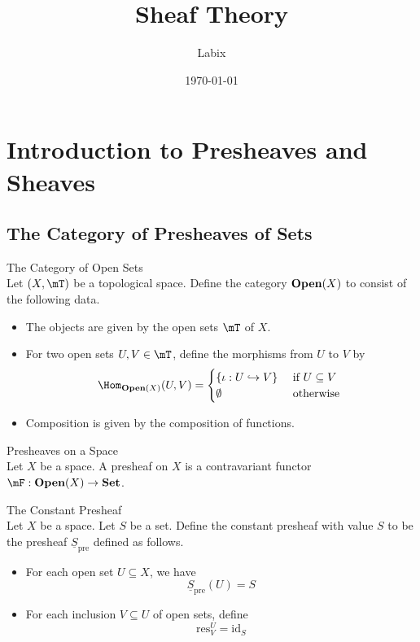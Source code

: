 \documentclass[a4paper]{article}
\title{Sheaf Theory}
\author{Labix}
\date{\today}
\begin{document}
\maketitle
\begin{abstract}
\end{abstract}
\pagebreak
\tableofcontents
\pagebreak

\pagebreak
\section{Introduction to Presheaves and Sheaves}
\subsection{The Category of Presheaves of Sets}
\begin{defn}{The Category of Open Sets}{}\\
Let $(X,\mT)$ be a topological space. Define the category $\bold{Open}(X)$ to consist of the following data. 
\begin{itemize}
\item The objects are given by the open sets $\mT$ of $X$. 
\item For two open sets $U,V\in\mT$, define the morphisms from $U$ to $V$ by $$\Hom_{\bold{Open}(X)}(U,V)=\begin{cases}
\{\iota:U\hookrightarrow V\} & \text{ if }U\subseteq V\\
\emptyset & \text{ otherwise }
\end{cases}$$
\item Composition is given by the composition of functions. 
\end{itemize}
\end{defn}

\begin{defn}{Presheaves on a Space}{}\\
Let $X$ be a space. A presheaf on $X$ is a contravariant functor $\mF:\bold{Open}(X)\to\bold{Set}$. 
\end{defn}

\begin{eg}{The Constant Presheaf}{}\\
Let $X$ be a space. Let $S$ be a set. Define the constant presheaf with value $S$ to be the presheaf $\underline{S}_\text{pre}$ defined as follows. 
\begin{itemize}
\item For each open set $U\subseteq X$, we have $$\underline{S}_\text{pre}(U)=S$$
\item For each inclusion $V\subseteq U$ of open sets, define $$\text{res}_V^U=\text{id}_S$$
\end{itemize}
\end{eg}
\end{document}
